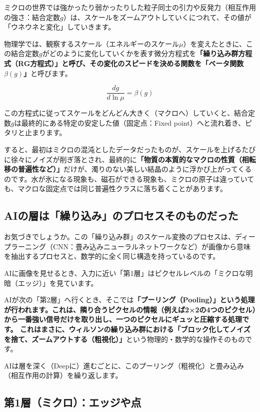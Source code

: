 ミクロの世界では強かったり弱かったりした粒子同士の引力や反発力（相互作用の強さ：結合定数\(g\)）は、スケールをズームアウトしていくにつれて、その値が「ウネウネと変化」していきます。

物理学では、観察するスケール（エネルギーのスケール\(\mu\)）を変えたときに、この結合定数\(g\)がどのように変化していくかを表す微分方程式を\textbf{「繰り込み群方程式（RG方程式）」と呼び、その変化のスピードを決める関数を「ベータ関数\(\beta(g)\)」}と呼びます。

\[\frac{dg}{d\ln \mu} = \beta(g)\]

この方程式に従ってスケールをどんどん大きく（マクロへ）していくと、結合定数\(g\)は最終的にある特定の安定した値（固定点：Fixed point）へと流れ着き、ピタリと止まります。

すると、最初はミクロの混沌としたデータだったものが、スケールを上げるたびに徐々にノイズが削ぎ落とされ、最終的に\textbf{「物質の本質的なマクロの性質（相転移の普遍性など）」}だけが、濁りのない美しい結晶のように浮かび上がってくるのです。水が氷になる現象も、磁石ができる現象も、ミクロの原子は違っていても、マクロな固定点では同じ普遍性クラスに落ち着くことがあります。

\subsection{AIの層は「繰り込み」のプロセスそのものだった}

お気づきでしょうか。この「繰り込み群」のスケール変換のプロセスは、ディープラーニング（CNN：畳み込みニューラルネットワークなど）が画像から意味を抽出するプロセスと、数学的に全く同じ構造を持っているのです。

AIに画像を見せるとき、入力に近い「第1層」はピクセルレベルの「ミクロな明暗（エッジ）」を見ています。

AIが次の「第2層」へ行くとき、そこでは\textbf{「プーリング（Pooling）」という処理が行われます。これは、隣り合うピクセルの情報（例えば2×2の4つのピクセル）から一番強い信号だけを取り出し、一つのピクセルにギュッと圧縮する処理です。 これはまさに、ウィルソンの繰り込み群における「ブロック化してノイズを捨て、ズームアウトする（粗視化）」}という物理的・数学的な操作そのものです。

AIは層を深く（Deepに）進むごとに、このプーリング（粗視化）と畳み込み（相互作用の計算）を繰り返します。

\subsection{第1層（ミクロ）：エッジや点}

